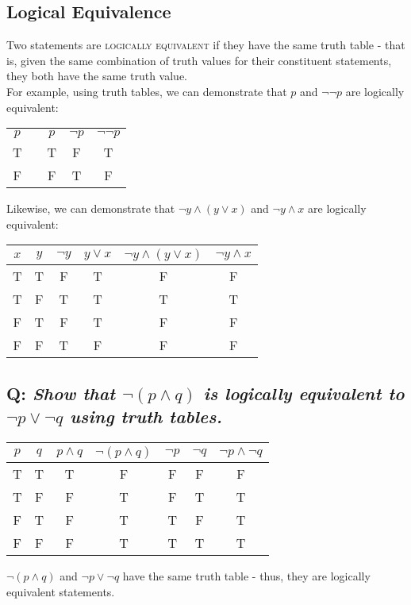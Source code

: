 \documentclass{article}
\begin{document}
\subsection{\sc Logical Equivalence}
Two statements are \textsc{logically equivalent} if they have the same truth table - that is, given the same combination of truth values for their constituent statements, they both have the same truth value.\\[1ex]
For example, using truth tables, we can demonstrate that $p$ and $\neg\neg p$ are logically equivalent:
\begin{center}
\begin{tabular}{ccc|c|c}
$p$&&$p$&$\neg p$&$\neg\neg p$\\
\cline{1-1}\cline{3-5} \color{red}T&&T&F&\color{red}T\\
\color{red}F&&F&T&\color{red}F
\end{tabular}
\end{center}
Likewise, we can demonstrate that $\neg y\wedge (y\vee x)$ and $\neg y\wedge x$ are logically equivalent:
\begin{center}
\begin{tabular}{cc|c|c|c||c}
$x$&$y$&$\neg y$&$y\vee x$&$\neg y\wedge (y\vee x)$&$\neg y\wedge x$\\\hline
T&T&F&T&\color{red}F&\color{red}F\\
T&F&T&T&\color{red}T&\color{red}T\\
F&T&F&T&\color{red}F&\color{red}F\\
F&F&T&F&\color{red}F&\color{red}F\\
\end{tabular}
\end{center}

\subsection*{Q: {\em Show that $\neg(p\wedge q)$ is logically equivalent to $\neg p\vee\neg q$ using truth tables.}}
\begin{center}
\begin{tabular}{cc|c|c||c|c|c}
$p$&$q$&$p\wedge q$&$\neg(p\wedge q)$&$\neg p$&$\neg q$&$\neg p\wedge\neg q$\\\hline
T&T&T&F&F&F&F\\
T&F&F&T&F&T&T\\
F&T&F&T&T&F&T\\
F&F&F&T&T&T&T
\end{tabular}
\end{center}
$\neg(p\wedge q)$ and $\neg p\vee\neg q$ have the same truth table - thus, they are logically equivalent statements.
\end{document}

